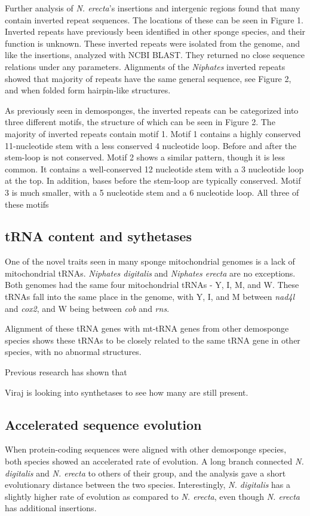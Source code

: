 \documentclass[../main.tex]{subfiles}
\begin{document}
Further analysis of \emph{N. erecta}'s insertions and intergenic regions found that many contain inverted repeat sequences. The locations of these can be seen in Figure 1.  Inverted repeats have previously been identified in other sponge species, and their function is unknown. These inverted repeats were isolated from the genome, and like the insertions, analyzed with NCBI BLAST. They returned no close sequence relations under any parameters. Alignments of the \emph{Niphates} inverted repeats showed that majority of repeats have the same general sequence, see Figure 2, and when folded form hairpin-like structures.

As previously seen in demosponges, the inverted repeats can be categorized into three different motifs, the structure of which can be seen in Figure 2. The majority of inverted repeats contain motif 1. Motif 1 contains a highly conserved 11-nucleotide stem with a less conserved 4 nucleotide loop. Before and after the stem-loop is not conserved. Motif 2 shows a similar pattern, though it is less common. It contains a well-conserved 12 nucleotide stem with a 3 nucleotide loop at the top. In addition, bases before the stem-loop are typically conserved. Motif 3 is much smaller, with a 5 nucleotide stem and a 6 nucleotide loop. All three of these motifs 

\subsection{tRNA content and sythetases}
One of the novel traits seen in many sponge mitochondrial genomes is a lack of mitochondrial tRNAs. \emph{Niphates digitalis} and \emph{Niphates erecta} are no exceptions. Both genomes had the same four mitochondrial tRNAs - Y, I, M, and W. These tRNAs fall into the same place in the genome, with Y, I, and M between \emph{nad4l} and \emph{cox2}, and W being between \emph{cob} and \emph{rns}.

Alignment of these tRNA genes with mt-tRNA genes from other demosponge species shows these tRNAs to be closely related to the same tRNA gene in other species, with no abnormal structures. 

Previous research has shown that 

Viraj is looking into synthetases to see how many are still present.

\subsection{Accelerated sequence evolution}
When protein-coding sequences were aligned with other demosponge species, both species showed an accelerated rate of evolution. A long branch connected \emph{N. digitalis} and \emph{N. erecta} to others of their group, and the analysis gave a short evolutionary distance between the two species. Interestingly, \emph{N. digitalis} has a slightly higher rate of evolution as compared to \emph{N. erecta}, even though \emph{N. erecta} has additional insertions.
\end{document}
